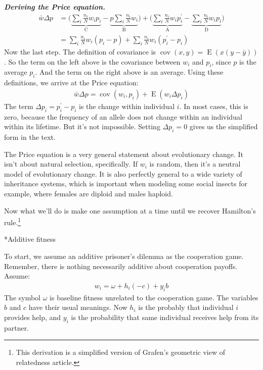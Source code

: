 \documentclass[10pt,reqno]{amsbook}
\makeatletter
\DeclareMathOperator{\cov}{cov}
\DeclareMathOperator{\E}{E}
\renewcommand\subsection{\@startsection{subsection}{2}
\z@{.5\linespacing\@plus.7\linespacing}{-.5em}%
{\normalfont\normalsize\bfseries}}
\numberwithin{equation}{chapter}
\newenvironment{mathbox}[2]
{\begin{table}[#1]
\justify\begin{tcolorbox}[enhanced, oversize]\footnotesize\noindent\textbf{\emph{#2}}}
{\end{tcolorbox}\end{table}}
\makeatother
\begin{document}
\begin{mathbox}{p}{Deriving the Price equation.}
\begin{align*}
	\bar w \Delta p &= 
	\bigg( 
	  \underbrace{ \sum_i \frac{n_i}{N} w_i p_i }_\text{C}
	- \underbrace{p \sum_i \frac{n_i}{N}w_i }_\text{B}
	\bigg) + 
	\bigg(
		\underbrace{\sum_i \frac{ n_i }{N} w_i p_i^\prime }_\text{A}
	- \underbrace{ \sum_i \frac{n_i}{N} w_i p_i }_\text{D}
	\bigg) \\
	&= \sum_i \frac{n_i}{N} w_i(p_i - p) + \sum_i \frac{n_i}{N} w_i(p_i^\prime - p_i)
\end{align*}
Now the last step. The definition of covariance is $\cov(x,y) = \E  ( x(y- \bar y ) )$. So the term on the left above is the covariance between $w_i$ and $p_i$, since $p$ is the average $p_i$. And the term on the right above is an average. Using these definitions, we arrive at the Price equation:
\begin{align*}
	\bar w \Delta p = \cov(w_i,p_i) +  \E ( w_i \Delta p_i )
\end{align*}
The term $\Delta p_i = p_i^\prime - p_i$ is the change within individual $i$. In most cases, this is zero, because the frequency of an allele does not change within an individual within its lifetime. But it's not impossible. Setting $\Delta p_i=0$ gives us the simplified form in the text.
\end{mathbox}

The Price equation is a very general statement about evolutionary change. It isn't about natural selection, specifically. If $w_i$ is random, then it's a neutral model of evolutionary change. It is also perfectly general to a wide variety of inheritance systems, which is important when modeling some social insects for example, where females are diploid and males haploid.

Now what we'll do is make one assumption at a time until we recover Hamilton's rule.\footnote{This derivation is a simplified version of Grafen's geometric view of relatedness article.}

\subsection*{Additive fitness}

To start, we assume an additive prisoner's dilemma as the cooperation game. Remember, there is nothing necessarily additive about cooperation payoffs. Assume:
\begin{align*}
	w_i = \omega + h_i (-c) + y_i b
\end{align*}
The symbol $\omega$ is baseline fitness unrelated to the cooperation game. The variables $b$ and $c$ have their usual meanings. Now $h_i$ is the probably that individual $i$ provides help, and $y_i$ is the probability that same individual receives help from its partner.
\end{document}
